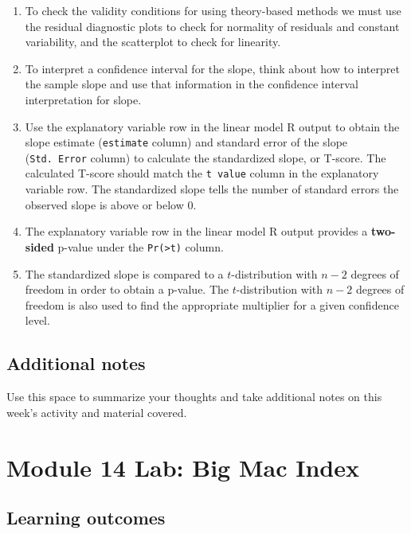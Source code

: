\documentclass[
]{report}
\begin{document}
\begin{enumerate}
\def\labelenumi{\arabic{enumi}.}
\item
  To check the validity conditions for using theory-based methods we must use the residual diagnostic plots to check for normality of residuals and constant variability, and the scatterplot to check for linearity.
\item
  To interpret a confidence interval for the slope, think about how to interpret the sample slope and use that information in the confidence interval interpretation for slope.
\item
  Use the explanatory variable row in the linear model R output to obtain the slope estimate (\texttt{estimate} column) and standard error of the slope (\texttt{Std.\ Error} column) to calculate the standardized slope, or T-score. The calculated T-score should match the \texttt{t\ value} column in the explanatory variable row. The standardized slope tells the number of standard errors the observed slope is above or below 0.
\item
  The explanatory variable row in the linear model R output provides a \textbf{two-sided} p-value under the \texttt{Pr(\textgreater{}\textbar{}t\textbar{})} column.
\item
  The standardized slope is compared to a \(t\)-distribution with \(n-2\) degrees of freedom in order to obtain a p-value. The \(t\)-distribution with \(n-2\) degrees of freedom is also used to find the appropriate multiplier for a given confidence level.
\end{enumerate}

\hypertarget{additional-notes-23}{%
\subsection{Additional notes}\label{additional-notes-23}}

Use this space to summarize your thoughts and take additional notes on this week's activity and material covered.

\newpage

\hypertarget{module-14-lab-big-mac-index}{%
\section{Module 14 Lab: Big Mac Index}\label{module-14-lab-big-mac-index}}


\hypertarget{learning-outcomes-30}{%
\subsection{Learning outcomes}\label{learning-outcomes-30}}
\end{document}
